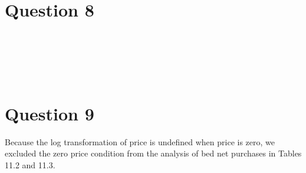\documentclass[11pt,notitlepage]{article}\usepackage[]{graphicx}\usepackage[]{color}
\makeatletter
\newenvironment{kframe}{%
 \def\at@end@of@kframe{}%
 \ifinner\ifhmode%
  \def\at@end@of@kframe{\end{minipage}}%
  \begin{minipage}{\columnwidth}%
 \fi\fi%
 \def\FrameCommand##1{\hskip\@totalleftmargin \hskip-\fboxsep
 \colorbox{shadecolor}{##1}\hskip-\fboxsep
     \hskip-\linewidth \hskip-\@totalleftmargin \hskip\columnwidth}%
 \MakeFramed {\advance\hsize-\width
   \@totalleftmargin\z@ \linewidth\hsize
   \@setminipage}}%
 {\par\unskip\endMakeFramed%
 \at@end@of@kframe}
\newenvironment{knitrout}{}{} %
\makeatother
\begin{document}
\section*{Question 8}
\begin{knitrout}
\color{fgcolor}\begin{kframe}
\begin{verbatim}





\end{verbatim}
\end{kframe}
\end{knitrout}



\section*{Question 9}
Because the log transformation of price is undefined when price is zero, we excluded the zero price condition from the analysis of bed net purchases in Tables 11.2 and 11.3.
\end{document}
